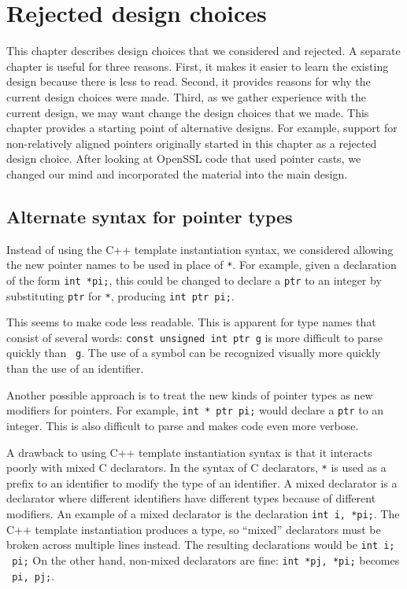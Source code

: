 
\chapter{Rejected design choices}
\label{chapter:design-alternatives}

This chapter describes design choices that we considered and rejected.
A separate chapter is useful for three reasons.   First, it makes it 
easier to learn the existing design because there is less to read.
Second, it provides reasons for why the current
design choices were made.  Third, as we gather experience with the current
design, we may want change the design choices that we made. 
This chapter provides a starting point 
of alternative designs.  For example, support for non-relatively 
aligned pointers originally started in this chapter as a rejected design choice. 
After looking at OpenSSL code that
used pointer casts, we changed our mind and incorporated
the material into the main design.

\section{Alternate syntax for pointer types}
\label{section:alternate-pointer-type-syntax}

Instead of using the C++ template instantiation syntax, we
considered allowing the new pointer names to be used in place of \texttt{*}.
For example, given a declaration of the form \texttt{int *pi;}, this could be changed
to declare a \texttt{ptr} to an integer by substituting \texttt{ptr} for \texttt{*},
producing \texttt{int ptr pi;}.
  
This seems to make code less readable.  This is apparent for type names that 
consist of several words: \texttt{const unsigned int ptr g} is more
difficult to parse quickly than \texttt{ g}.
The use of a symbol can be recognized visually more quickly than the use 
of an identifier.  

Another possible approach is to treat the new kinds
of pointer types  as new modifiers for pointers.  For example, 
\texttt{int * ptr pi;} would declare a \texttt{ptr} to an integer. This is 
also difficult to parse and makes code even more verbose.

A drawback to using C++ template instantiation syntax is that it interacts
poorly with mixed C declarators. In the syntax of C declarators, \texttt{*} is used as
a prefix to an identifier to modify the type of an identifier. A mixed
declarator is a declarator where different identifiers have different
types because of different modifiers. An example of a mixed declarator
is the declaration \texttt{int i, *pi;}. The C++ template instantiation produces a
type, so ``mixed'' declarators must be broken across multiple
lines instead. The resulting declarations would be 
\texttt{int i; \ptrint\ pi;} On the other hand, non-mixed
declarators are fine: \texttt{int *pj, *pi;} becomes
\texttt{\ptrint\ pi, pj;}.

